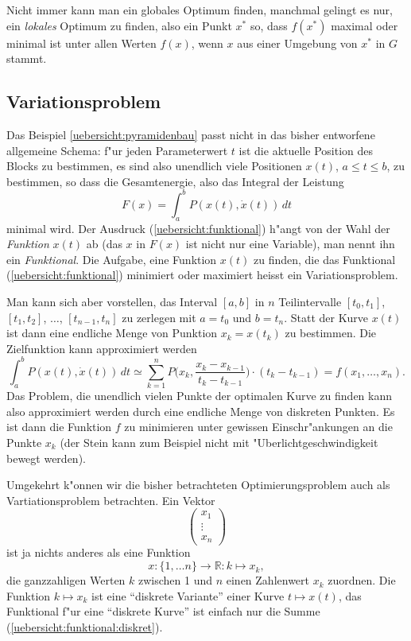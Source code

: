 Nicht immer kann man ein globales Optimum finden, manchmal gelingt es
nur, ein {\it lokales} Optimum zu finden, also ein Punkt $x^*$ so,
dass $f(x^*)$ maximal oder minimal ist unter allen Werten $f(x)$,
wenn $x$ aus einer Umgebung von $x^*$ in $G$ stammt.

\subsection{Variationsproblem}
Das Beispiel \ref{uebersicht:pyramidenbau} passt nicht in das bisher
entworfene allgemeine Schema: f"ur jeden
Parameterwert $t$ ist die aktuelle Position des Blocks zu bestimmen,
es sind also unendlich viele Positionen $x(t)$, $a\le t\le b$, zu bestimmen, so 
dass die Gesamtenergie, also das Integral der Leistung
\begin{equation}
F(x)=
\int_{a}^{b}P(x(t),\dot x(t))\,dt
\label{uebersicht:funktional}
\end{equation}
minimal wird.
Der Ausdruck (\ref{uebersicht:funktional}) h"angt von der Wahl der
{\em Funktion} $x(t)$ ab (das $x$ in $F(x)$ ist nicht nur eine
Variable), man nennt ihn ein {\em Funktional}.
Die Aufgabe, eine Funktion $x(t)$ zu finden, die das Funktional
(\ref{uebersicht:funktional}) minimiert oder maximiert heisst
ein Variationsproblem.

Man kann sich aber vorstellen, das Interval
$[a,b]$ in $n$ Teilintervalle
$[t_0,t_1]$, $[t_1,t_2]$, $\dots$, $[t_{n-1},t_n]$ zu
zerlegen mit $a=t_0$ und $b=t_n$. Statt der Kurve
$x(t)$ ist dann eine endliche Menge von Punktion $x_k=x(t_k)$ 
zu bestimmen. Die Zielfunktion kann approximiert werden
\begin{equation}
\int_{a}^{b}P(x(t),\dot x(t))\,dt
\simeq
\sum_{k=1}^n P\biggl(x_k,\frac{x_k-x_{k-1}}{t_k-t_{k-1}}\biggr)\cdot (t_k-t_{k-1})
=f(x_1,\dots,x_n).
\label{uebersicht:funktional:diskret}
\end{equation}
Das Problem, die unendlich vielen Punkte der optimalen Kurve
zu finden kann also approximiert werden durch eine endliche Menge
von diskreten Punkten.
Es ist dann die Funktion $f$ zu minimieren
unter gewissen Einschr"ankungen an die Punkte $x_k$ (der Stein kann
zum Beispiel nicht mit "Uberlichtgeschwindigkeit bewegt werden).


Umgekehrt k"onnen wir die bisher betrachteten Optimierungsproblem auch
als Vartiationsproblem betrachten. Ein Vektor
\[
\begin{pmatrix}
x_1\\\vdots\\ x_n
\end{pmatrix}
\]
ist ja nichts anderes als eine Funktion
\[
x\colon \{1,\dots n\}\to \mathbb R: k\mapsto x_k,
\]
die ganzzahligen Werten $k$ zwischen 1 und $n$ einen Zahlenwert $x_k$
zuordnen.
Die Funktion $k\mapsto x_k$ ist eine ``diskrete Variante'' einer
Kurve $t\mapsto x(t)$, das Funktional f"ur eine ``diskrete Kurve''
ist einfach nur die Summe (\ref{uebersicht:funktional:diskret}).




